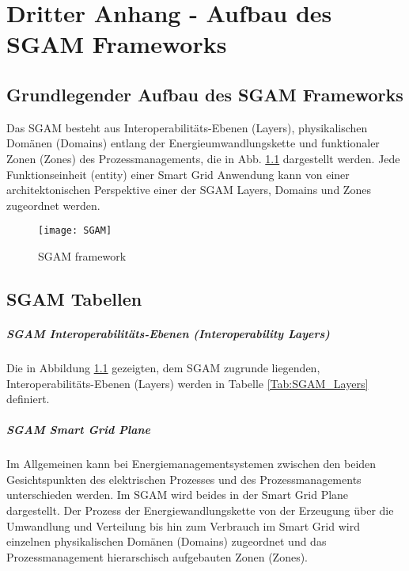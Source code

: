 \chapter{Dritter Anhang - Aufbau des SGAM Frameworks}
\label{Kap:SGAM_aufbau}

\section{Grundlegender Aufbau des SGAM Frameworks}
	Das \ac{SGAM} besteht aus Interoperabilitäts-Ebenen (Layers), physikalischen Domänen (Domains) entlang der Energieumwandlungskette und funktionaler Zonen (Zones) des Prozessmanagements, die in Abb. \ref{Abb:SGAM} dargestellt werden.  Jede Funktionseinheit (entity) einer Smart Grid Anwendung kann von einer architektonischen Perspektive einer der SGAM Layers, Domains und Zones zugeordnet werden.

	\begin{figure}[h]
		\centering
		\texttt{[image: SGAM]}
		\caption{SGAM framework \cite{CENELEC_SmartGrid}}
		\label{Abb:SGAM}
	\end{figure}
	
	\section{SGAM Tabellen}
	
	\paragraph{SGAM Interoperabilitäts-Ebenen (Interoperability Layers)}
		Die in Abbildung \ref{Abb:SGAM} gezeigten, dem SGAM zugrunde liegenden, Interoperabilitäts-Ebenen (Layers) werden in Tabelle \ref{Tab:SGAM_Layers} definiert.		
	
	\paragraph{SGAM Smart Grid Plane}
		Im Allgemeinen kann bei Energiemanagementsystemen zwischen den beiden Gesichtspunkten des elektrischen Prozesses und des Prozessmanagements unterschieden werden. Im SGAM wird beides in der Smart Grid Plane dargestellt. Der Prozess der Energiewandlungskette von der Erzeugung über die Umwandlung und Verteilung bis hin zum Verbrauch im Smart Grid wird einzelnen physikalischen Domänen (Domains) zugeordnet und das Prozessmanagement hierarschisch aufgebauten Zonen (Zones). \\
	
